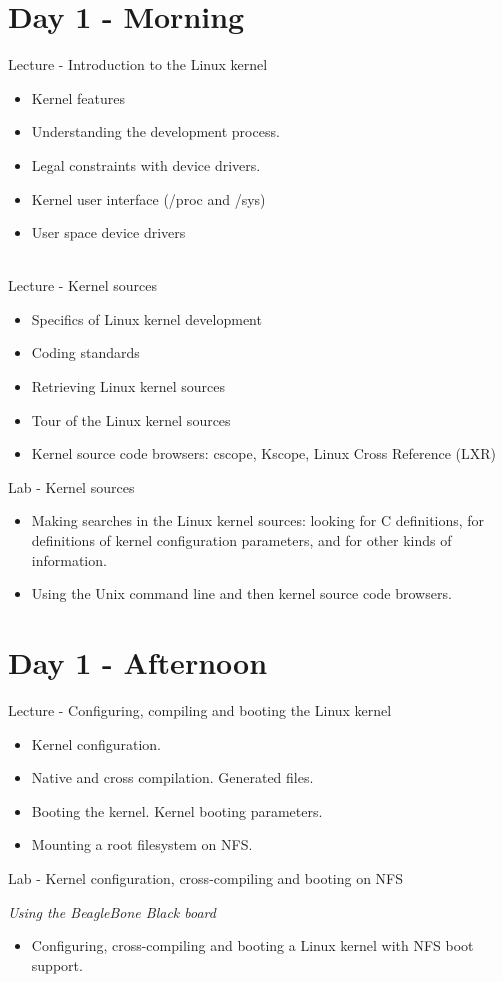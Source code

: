 \documentclass[a4paper,12pt,obeyspaces,spaces,hyphens]{article}
\begin{document}
\section{Day 1 - Morning}

\feagendaonecolumn
{Lecture - Introduction to the Linux kernel}
{
  \begin{itemize}
  \item Kernel features
  \item Understanding the development process.
  \item Legal constraints with device drivers.
  \item Kernel user interface (/proc and /sys)
  \item User space device drivers
  \end{itemize}
}
\\
\feagendatwocolumn
{Lecture - Kernel sources}
{
  \begin{itemize}
  \item Specifics of Linux kernel development
  \item Coding standards
  \item Retrieving Linux kernel sources
  \item Tour of the Linux kernel sources
  \item Kernel source code browsers: cscope, Kscope, Linux Cross
    Reference (LXR)
  \end{itemize}
}
{Lab - Kernel sources}
{
  \begin{itemize}
  \item Making searches in the Linux kernel sources: looking for C
    definitions, for definitions of kernel configuration parameters,
    and for other kinds of information.
  \item Using the Unix command line and then kernel source code
    browsers.
 \end{itemize}
}

\section{Day 1 - Afternoon}
\feagendatwocolumn
{Lecture - Configuring, compiling and booting the Linux kernel}
{
  \begin{itemize}
  \item Kernel configuration.
  \item Native and cross compilation. Generated files.
  \item Booting the kernel. Kernel booting parameters.
  \item Mounting a root filesystem on NFS.
  \end{itemize}
}
{Lab - Kernel configuration, cross-compiling and booting on NFS}
{
  {\em Using the BeagleBone Black board}
  \begin{itemize}
  \item Configuring, cross-compiling and booting a Linux kernel with
    NFS boot support.
  \end{itemize}
}
\\
\end{document}
